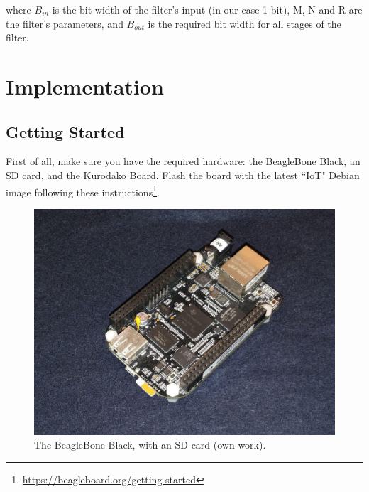 \documentclass[]{report}
\begin{document}
\noindent where \(B_{in}\) is the bit width of the filter's input (in our case 1
bit), M, N and R are the filter's parameters, and \(B_{out}\) is the
required bit width for all stages of the filter.

\hypertarget{implementation}{%
\chapter{Implementation}\label{implementation}}

\hypertarget{getting-started}{%
\section{Getting Started}\label{getting-started}}

First of all, make sure you have the required hardware: the BeagleBone
Black, an SD card, and the Kurodako Board. Flash the board with the
latest ``IoT" Debian image following these instructions\footnote{\url{https://beagleboard.org/getting-started}}.


\begin{figure}[H]
\centering
\includegraphics[width=0.9\linewidth]{Pictures/BBB.jpg}
\caption{The BeagleBone Black, with an SD card (own work).}
\end{figure}

\end{document}
